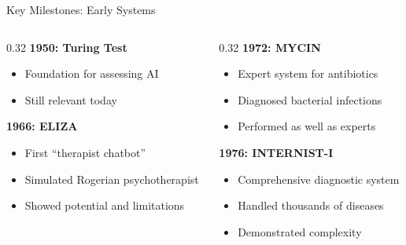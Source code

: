 \documentclass[aspectratio=169, 10pt]{beamer}
\begin{document}
\begin{frame}{Key Milestones: Early Systems}

    \begin{columns}
        \begin{column}{0.32\textwidth}
            \textbf{1950: Turing Test}
            \begin{itemize}
                \item Foundation for assessing AI
                \item Still relevant today
            \end{itemize}

            \vspace{2mm}
            \textbf{1966: ELIZA}
            \begin{itemize}
                \item First ``therapist chatbot''
                \item Simulated Rogerian psychotherapist
                \item Showed potential and limitations
            \end{itemize}
        \end{column}

        \begin{column}{0.32\textwidth}
            \textbf{1972: MYCIN}
            \begin{itemize}
                \item Expert system for antibiotics
                \item Diagnosed bacterial infections
                \item Performed as well as experts
            \end{itemize}

            \vspace{2mm}
            \textbf{1976: INTERNIST-I}
            \begin{itemize}
                \item Comprehensive diagnostic system
                \item Handled thousands of diseases
                \item Demonstrated complexity
            \end{itemize}
        \end{column}


\end{columns}
\end{frame}
\end{document}
